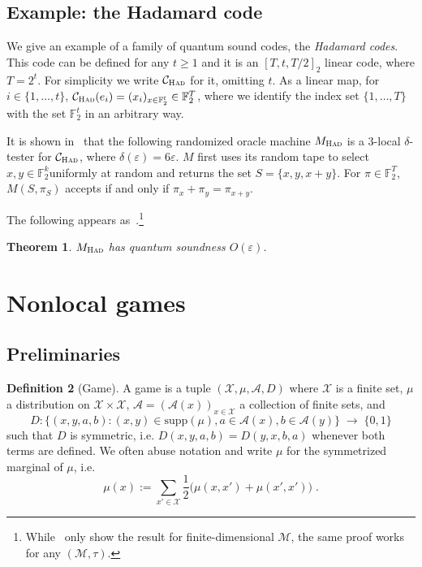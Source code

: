 \documentclass[11pt]{article}
\newtheorem{theorem}{Theorem}[section]
\theoremstyle{definition}
\newtheorem{definition}[theorem]{Definition}
\newcommand{\code}{\mathcal{C}}
\newcommand{\field}{\mathbb{F}_2}
\newcommand{\N}{\ensuremath{\mathbb{N}}}
\newcommand{\mA}{\ensuremath{\mathcal{A}}}
\newcommand{\mM}{\ensuremath{\mathcal{M}}}
\newcommand{\mX}{\ensuremath{\mathcal{X}}}
\newcommand{\had}{\textsc{Had}}
\newcommand{\eps}{\varepsilon}
\begin{document}
		
		
\subsection{Example: the Hadamard code}
\label{sec:had}

We give an example of a family of quantum sound codes, the \emph{Hadamard codes}. This code can be defined for any  $t\geq 1$ and it is an $[T,t,T/2]_2$ linear code, where $T=2^t$. For simplicity we write  $\code_\had$ for it, omitting $t$. As a linear map, for $i\in\{1,\ldots,t\}$, $\code_\had(e_i) = (x_i)_{x\in \field^t} \in \field^T$, where we identify the index set $\{1,\ldots,T\}$ with the set $\field^t$ in an arbitrary way.  

It is shown in~\cite{blum1990self} that the following randomized oracle machine $M_\had$ is a $3$-local $\delta$-tester for $\code_\had$, where $\delta(\eps)=6\eps$. $M$ first uses its random tape to select $x,y\in\field^k$uniformly at random and returns the set $S=\{x,y,x+y\}$. For $\pi\in \field^T$, $M(S,\pi_S)$ accepts if and only if $\pi_x + \pi_y  = \pi_{x+y}$. 

The following appears as~\cite[Theorem 10]{natarajan2016robust}.\footnote{While~\cite{natarajan2016robust} only show the result for finite-dimensional $\mM$, the same proof works for any $(\mM,\tau)$.}
 
\begin{theorem}
$M_\had$ has quantum soundness $O(\eps)$.
\end{theorem}

%
%
%


\section{Nonlocal games}

\subsection{Preliminaries}

\begin{definition}[Game]
A game is a tuple $(\mX,\mu,\mA,D)$ where $\mX$ is a finite set, $\mu$ a distribution on $\mX\times \mX$, $\mA=(\mA(x))_{x\in\mX}$ a collection of finite sets, and 
\[ D: \big\{ (x,y,a,b) : (x,y)\in\text{supp}(\mu),a\in\mA(x),b\in\mA(y)\big\} \;\to\;\{0,1\}\]
such that $D$ is symmetric, i.e. $D(x,y,a,b)=D(y,x,b,a)$ whenever both terms are defined. We often abuse notation and write $\mu$ for the symmetrized marginal of $\mu$, i.e.\ 
\[\mu(x) := \sum_{x'\in \mX} \frac{1}{2}\big(\mu(x,x')+\mu(x',x')\big)\;.\]
\end{definition}
		
\end{document}
